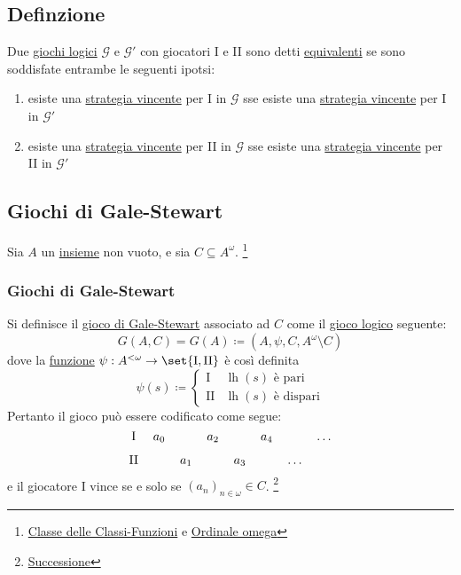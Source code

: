 \documentclass{article}
\newcommand{\1}{\mathds{1}}
\begin{document}
\subsection{Definzione}
\label{sec:orgb665389}
Due \href{../../../../../../../org/roam/20250513155732-logic_game.org}{giochi logici} \(\mathcal{G}\) e \(\mathcal{G'}\) con giocatori I e II sono detti \uline{equivalenti} se sono soddisfate entrambe le seguenti ipotsi:
\begin{enumerate}
\item esiste una \hyperref[sec:org7f68e17]{strategia vincente} per I in \(\mathcal{G}\) sse esiste una \hyperref[sec:org7f68e17]{strategia vincente} per I in \(\mathcal{G}'\)
\item esiste una \hyperref[sec:org7f68e17]{strategia vincente} per II in \(\mathcal{G}\) sse esiste una \hyperref[sec:org7f68e17]{strategia vincente} per II in \(\mathcal{G}'\)
\end{enumerate}
\subsection{Giochi di Gale-Stewart}
\label{sec:org382d9d1}

Sia \(A\) un \href{../../../../../../../org/roam/20250130104331-insieme_mk.org}{insieme} non vuoto, e sia \(C \subseteq A^{\omega}\). \footnote{\href{../../../../../../../org/roam/20250202192030-classe_delle_classi_funzioni.org}{Classe delle Classi-Funzioni} e \href{../../../../../../../org/roam/20250203161110-numeri_naturali_sono_ordinali.org}{Ordinale omega}}
\subsubsection{Giochi di Gale-Stewart}
\label{sec:org21a45cb}
Si definisce il \uline{gioco di Gale-Stewart} associato ad \(C\) come il \href{../../../../../../../org/roam/20250513155732-logic_game.org}{gioco logico} seguente:
\begin{equation*}
G(A,C) = G(A) \coloneqq (A, \psi, C, A^{\omega}\setminus C)
\end{equation*}
dove la \href{../../../../../../../org/roam/20250202170607-classe_relazione_binaria.org}{funzione} \(\psi: A^{<\omega}\to \set{\text{I},\text{II}}\) è così definita
\begin{equation*}
\psi(s) \coloneqq \begin{cases}
\text{I} & \operatorname{lh}(s)\text{ è pari}\\
\text{II} & \operatorname{lh}(s)\text{ è dispari}
\end{cases}
\end{equation*}
Pertanto il gioco può essere codificato come segue:
\begin{equation*}
\begin{tikzcd}[ampersand replacement=\&,cramped,sep=tiny]
	{\text{I}} \& {a_0} \&\& {a_2} \&\& {a_4} \&\& \dots \\
	{\text{II}} \&\& {a_1} \&\& {a_3} \&\& \dots
\end{tikzcd}
\end{equation*}
e il giocatore I vince se e solo se \((a_{n})_{n \in \omega} \in C\). \footnote{\href{../../../../../../../org/roam/20250115100904-successione.org}{Successione}}
\end{document}

